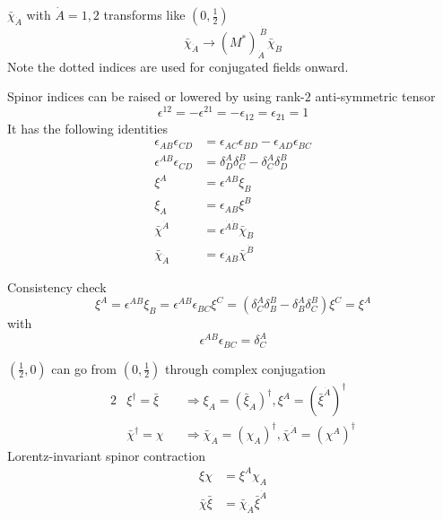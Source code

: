 $\bar{\chi}_{\dot{A}}$ with $\dot{A} = 1,2$ transforms like $(0, \frac{1}{2})$
\begin{equation}
   \bar \chi_{\dot A} \rightarrow (M^*)_{\dot{A}}^{\ \dot{B}} \bar \chi_{\dot B} \label{3.65}
\end{equation}
Note the dotted indices are used for conjugated fields onward. 

Spinor indices can be raised or lowered by using rank-$2$ anti-symmetric tensor
\begin{equation}
   \epsilon^{12} = -\epsilon^{21} = - \epsilon_{12} = \epsilon_{21} = 1 \label{3.66}
\end{equation}
It has the following identities
\begin{subequations} \label{3.67}
\begin{align}
   \epsilon_{AB} \epsilon_{CD} &= \epsilon_{AC} \epsilon_{BD} - \epsilon_{AD} \epsilon_{BC} \label{3.67a} \\
   \epsilon^{AB} \epsilon_{CD} &= \delta^A_D \delta^B_C - \delta^A_C \delta^B_D \label{3.67b} \\
   \xi^A &= \epsilon^{AB} \xi_B \label{3.67c} \\
   \xi_A &= \epsilon_{AB} \xi^{B} \label{3.67d} \\
   \bar{\chi}^{\dot{A}} &= \epsilon^{\dot A \dot B} \bar \chi_{\dot{B}} \label{3.67e}\\
   \bar\chi_{\dot A} &= \epsilon_{\dot A \dot B} \bar \chi ^{\dot B} \label{3.67f}
\end{align}
\end{subequations}

Consistency check
\begin{equation*}
   \xi^A = \epsilon^{AB} \xi_B = \epsilon^{AB} \epsilon_{BC} \xi^C = (\delta^A_C \delta^B_B - \delta^A_B \delta^B_C) \xi^C = \xi^A
\end{equation*}
with 
\begin{equation}
   \epsilon^{AB} \epsilon_{BC} = \delta^A_C \label{3.67g}
\end{equation}

$(\frac{1}{2},0)$ can go from $(0, \frac{1}{2})$ through complex conjugation
\begin{alignat}{2}
   &\xi^\dagger = \bar\xi &&\Rightarrow \xi_A = (\bar \xi_{\dot A})^\dagger, \xi^A = (\bar \xi^{\dot A})^\dagger \label{3.68a} \\
   &\bar\chi^\dagger = \chi &&\Rightarrow \bar\chi_{\dot A} = (\chi_A)^\dagger, \bar \chi^{\dot A} = (\chi^A)^\dagger \label{3.68b}
\end{alignat}
Lorentz-invariant spinor contraction
\begin{subequations}
\label{3.69}
   \begin{align}
      \xi \chi &= \xi^A\chi_A \label{3.69a} \\
   \bar \chi \bar\xi &= \bar\chi_{\dot A} \bar\xi^{\dot A} \label{3.69b}
\end{align}
  
\end{subequations}

